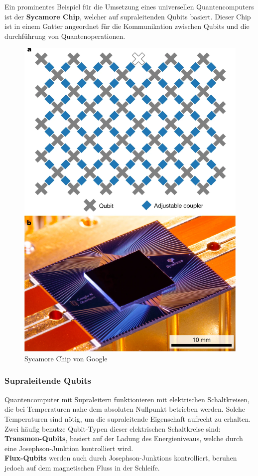 Ein prominentes Beispiel für die Umsetzung eines universellen Quantencomputers ist der \textbf{Sycamore Chip}, welcher auf supraleitenden Qubits basiert.
Dieser Chip ist in einem Gatter angeordnet für die Kommunikation zwischen Qubits und die durchführung von Quantenoperationen.\\

\begin{figure}[H]
    \centering
    \includegraphics[width=0.7\linewidth]{img/SycamoreChip.png}
    \caption{Sycamore Chip von Google}
    \label{fig:Sycamore}
\end{figure}

\subsubsection{Supraleitende Qubits}
\label{subsub:superleiter}
Quantencomputer mit Supraleitern funktionieren mit elektrischen Schaltkreisen, die bei Temperaturen nahe dem absoluten Nullpunkt betrieben werden. Solche Temperaturen sind nötig,
um die supraleitende Eigenschaft aufrecht zu erhalten.\\

Zwei häufig benutze Qubit-Typen dieser elektrischen Schaltkreise sind:\\
\textbf{Transmon-Qubits}, basiert auf der Ladung des Energieniveaus, welche durch eine Josephson-Junktion kontrolliert wird.\\
\textbf{Flux-Qubits} werden auch durch Josephson-Junktions kontrolliert, beruhen jedoch auf dem magnetischen Fluss in der Schleife.\\

